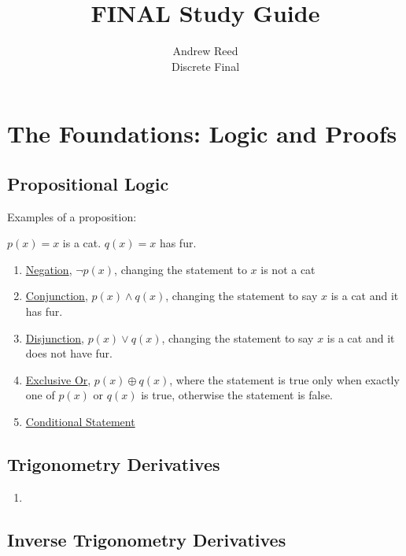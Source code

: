 \documentclass[12pt]{article}
\begin{document}
 
 
\title{FINAL Study Guide}%
\author{Andrew Reed\\ %
Discrete Final} %
 
\maketitle

\tableofcontents

\pagebreak

\section{The Foundations: Logic and Proofs}

\subsection{Propositional Logic}

Examples of a proposition:

$p(x) = x$ is a cat.
$q(x) = x$ has fur.

\begin{enumerate}
\item \underline{Negation}, $\neg p(x)$, changing the statement to $x$ is not a cat
\item \underline{Conjunction}, $p(x) \wedge q(x)$, changing the statement to say $x$ is a cat and it has fur.
\item \underline{Disjunction}, $p(x) \lor q(x)$, changing the statement to say $x$ is a cat and it does not have fur.
\item \underline{Exclusive Or},  $p(x) \oplus q(x)$, where the statement is true only when exactly one of $p(x)$ or $q(x)$ is true, otherwise the statement is false.
\item \underline{Conditional Statement}
\end{enumerate}

\subsection{Trigonometry Derivatives}

\begin{enumerate}
\item 
\end{enumerate}

\subsection{Inverse Trigonometry Derivatives}

\pagebreak
\end{document}
